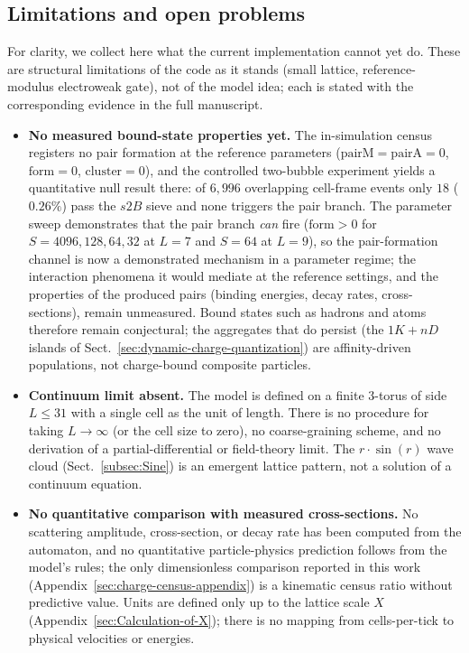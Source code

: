 \documentclass{ijuc}
\begin{document}
\subsection{Limitations and open problems}
For clarity, we collect here what the current implementation cannot yet do.  These are structural limitations of the code as it stands (small lattice, reference-modulus electroweak gate), not of the model idea; each is stated with the corresponding evidence in the full manuscript.
\begin{itemize}
\item \textbf{No measured bound-state properties yet.}  The in-simulation census registers no pair formation at the reference parameters ($\mathrm{pairM}=\mathrm{pairA}=0$, $\mathrm{form}=0$, $\mathrm{cluster}=0$), and the controlled two-bubble experiment yields a quantitative null result there: of $6{,}996$ overlapping cell-frame events only $18$ ($0.26\%$) pass the $s2B$ sieve and none triggers the pair branch.  The parameter sweep demonstrates that the pair branch \emph{can} fire ($\mathrm{form}>0$ for $S=4096,128,64,32$ at $L=7$ and $S=64$ at $L=9$), so the pair-formation channel is now a demonstrated mechanism in a parameter regime; the interaction phenomena it would mediate at the reference settings, and the properties of the produced pairs (binding energies, decay rates, cross-sections), remain unmeasured.  Bound states such as hadrons and atoms therefore remain conjectural; the aggregates that do persist (the $1K+nD$ islands of Sect.~\ref{sec:dynamic-charge-quantization}) are affinity-driven populations, not charge-bound composite particles.
\item \textbf{Continuum limit absent.}  The model is defined on a finite $3$-torus of side $L\le31$ with a single cell as the unit of length.  There is no procedure for taking $L\to\infty$ (or the cell size to zero), no coarse-graining scheme, and no derivation of a partial-differential or field-theory limit.  The $r\cdot\sin(r)$ wave cloud (Sect.~\ref{subsec:Sine}) is an emergent lattice pattern, not a solution of a continuum equation.
\item \textbf{No quantitative comparison with measured cross-sections.}  No scattering amplitude, cross-section, or decay rate has been computed from the automaton, and no quantitative particle-physics prediction follows from the model's rules; the only dimensionless comparison reported in this work (Appendix~\ref{sec:charge-census-appendix}) is a kinematic census ratio without predictive value.  Units are defined only up to the lattice scale $X$ (Appendix~\ref{sec:Calculation-of-X}); there is no mapping from cells-per-tick to physical velocities or energies.

\end{itemize}
\end{document}
